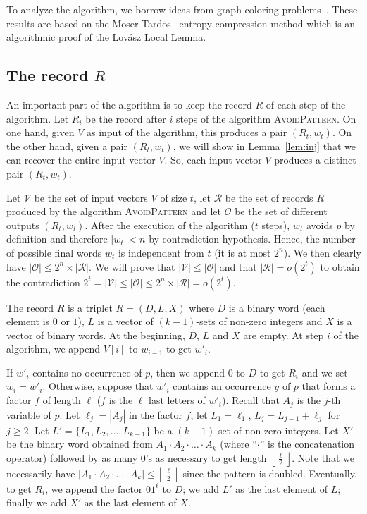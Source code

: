 \documentclass[]{elsart}
\def\floor#1{\left\lfloor #1 \right\rfloor}
\newcommand{\set}[1]{\{#1\}}
\newcommand{\ap}{\textsc{AvoidPattern}\xspace}
\begin{document}
To analyze the algorithm, we borrow ideas from graph coloring
problems~\cite{Joret:2012,Esperet:2012}. These results are based on
the Moser-Tardos~\cite{moser:2010} entropy-compression method which
is an algorithmic proof of the Lov\'asz Local Lemma.

\subsection{The record $R$}\label{subsec:record}

An important part of the algorithm is to keep the record $R$ of
each step of the algorithm.
Let $R_i$ be the record after $i$ steps of the algorithm \ap. On one
hand, given $V$ as input of the algorithm, this produces a pair
$(R_t,w_t)$. On the other hand, given
a pair $(R_t,w_t)$, we will show in Lemma~\ref{lem:inj} that we can
recover the entire input vector $V$.
So, each input vector $V$ produces a distinct pair $(R_t,w_t)$.
 
Let $\mathcal{V}$ be the set of input vectors $V$ of size $t$, let
$\mathcal{R}$ be the set of records $R$ produced by the algorithm \ap
and let $\mathscr{O}$ be the set of different outputs $(R_t,w_t)$.
After the execution of the algorithm ($t$ steps), $w_t$ avoids $p$ by
definition and therefore $|w_t|<n$ by contradiction hypothesis.
Hence, the number of possible final words $w_t$ is independent from
$t$ (it is at most $2^n$). We then clearly have $|\mathscr{O}| \le
2^n\times |\mathcal{R}|$.  We will prove that $|\mathcal{V}|\le
|\mathscr{O}|$ and that $|\mathcal{R}|=o(2^t)$ to obtain the
contradiction $2^t=|\mathcal{V}|\le |\mathscr{O}| \le
2^n\times|\mathcal{R}|=o(2^t)$.

The record $R$ is a triplet $R=(D,L,X)$ where $D$ is a binary word
(each element is $0$ or $1$), $L$ is a vector of $(k-1)$-sets of
non-zero integers and $X$ is a vector of binary words.  At the
beginning, $D$, $L$ and $X$ are empty.  At step $i$ of the algorithm,
we append $V[i]$ to $w_{i-1}$ to get $w'_i$.

If $w'_i$ contains no occurrence of $p$, then we append $0$ to $D$ to
get $R_i$ and we set $w_i=w'_i$.  Otherwise, suppose that $w'_i$
contains an occurrence $y$ of $p$ that forms a factor $f$ of length
$\ell$ ($f$ is the $\ell$ last letters of $w'_i$). Recall that $A_j$
is the $j$-th variable of $p$.  Let $\ell_j=|A_j|$ in the factor $f$,
let $L_1 = \ell_1$, $L_j=L_{j-1}+\ell_j$ for $j\ge 2$.  Let
$L'=\set{L_1,L_2,\ldots,L_{k-1}}$ be a $(k-1)$-set of non-zero
integers.  Let $X'$ be the binary word obtained from $A_1\cdot
A_2\cdot\ldots\cdot A_k$ (where ``$\cdot$'' is the concatenation
operator) followed by as many $0$'s as necessary to get length
$\floor{\frac{\ell}{2}}$. Note that we necessarily have $|A_1\cdot
A_2\cdot\ldots\cdot A_k|\le \floor{\frac{\ell}{2}}$ since the pattern
is doubled.
Eventually, to get $R_i$,
we append the factor $01^\ell$ to $D$;
we add $L'$ as the last element of $L$; finally we add $X'$ as the last element of $X$.
\end{document}
